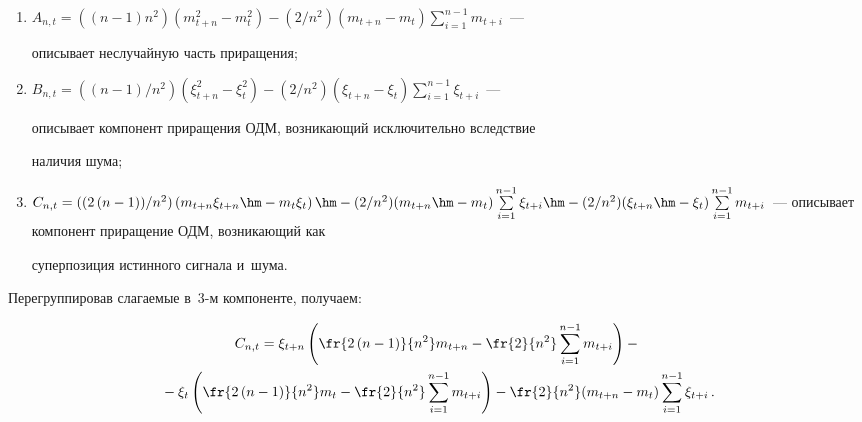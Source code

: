     \begin{enumerate}[(1)]


        \item $A_{n,t} = (({n-1}){n^2})\left(m^2_{t+n} - m^2_t\right) -


        ({2}/{n^2})\left(m_{t+n}-m_t\right)\sum\limits^{n-1}_{i=1}m_{t+i}$~---


        описывает неслучайную часть приращения;


        \item $B_{n,t} = (({n-1})/{n^2})\left(\xi^2_{t+n} - \xi^2_t\right) -


        ({2}/{n^2})\left(\xi_{t+n}-\xi_t\right)\sum\limits^{n-1}_{i=1}\xi_{t+i}$~---


        описывает компонент приращения ОДМ, возникающий исключительно вследствие


        наличия шума;


        \item $C_{n,t} = (({2\left(n-1\right)})/{n^2})\left(m_{t+n}\xi_{t+n}


        \hm- m_t\xi_t\right) \hm- ({2}/{n^2})(m_{t+n}\hm-m_t)\sum\limits^{n-1}_{i=1}


        \xi_{t+i}\hm - ({2}/{n^2})(\xi_{t+n}\hm-\xi_t)\sum\limits^{n-1}_{i=1}


        m_{t+i}$~--- описывает компонент приращение ОДМ, возникающий как


        суперпозиция истинного сигнала и~шума.


    \end{enumerate}





    Перегруппировав слагаемые в~3-м компоненте, получаем:


    \begin{multline}


        \label{C_n_t_final}


            C_{n,t} = \xi_{t+n}\left(\fr{2\left(n-1\right)}{n^2}m_{t+n} -


            \fr{2}{n^2}\sum\limits^{n-1}_{i=1}m_{t+i}\right) -{} \\


            {}- \xi_t\left(\fr{2\left(n-1\right)}{n^2}m_t -


            \fr{2}{n^2}\sum\limits^{n-1}_{i=1}m_{t+i}\right) -


\fr{2}{n^2}(m_{t+n}-m_t)\sum\limits^{n-1}_{i=1}\xi_{t+i}\,.


    \end{multline}






